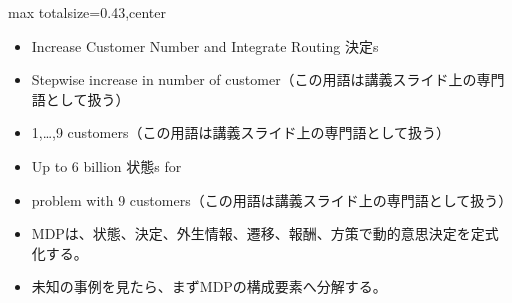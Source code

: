 \clearpage
{}
\begin{minipage}[t]{0.405\textwidth}
\begin{adjustbox}{max totalsize={\textwidth}{0.43\textheight},center}
\begin{minipage}{\textwidth}\scriptsize
{}\begin{itemize}
\item Increase Customer Number and Integrate Routing 決定s
\item Stepwise increase in number of customer（この用語は講義スライド上の専門語として扱う）
\item 1,…,9 customers（この用語は講義スライド上の専門語として扱う）
\item Up to 6 billion 状態s for
\item problem with 9 customers（この用語は講義スライド上の専門語として扱う）
\end{itemize}\begin{itemize}
\item MDPは、状態、決定、外生情報、遷移、報酬、方策で動的意思決定を定式化する。
\item 未知の事例を見たら、まずMDPの構成要素へ分解する。
\end{itemize}
\end{minipage}
\end{adjustbox}
\end{minipage}\hfill
